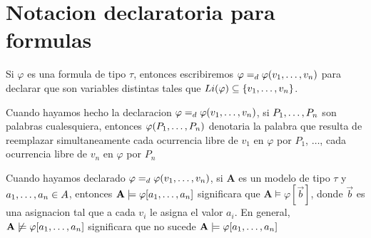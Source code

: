 \section{Notacion declaratoria para formulas}
\begin{definition}
  Si $\varphi$ es una formula de tipo $\tau$, entonces escribiremos $\varphi =_d \varphi(v_{1}, \dots, v_{n})$ para 
  declarar que  son variables distintas tales que $Li(\varphi) \subseteq \{v_{1}, \dots, v_{n}\}$.
\end{definition}

\begin{convention}
  Cuando hayamos hecho la declaracion $\varphi =_d \varphi(v_{1}, \dots, v_{n})$, si $P_{1}, \dots, P_{n}$ son palabras 
  cualesquiera, entonces $\varphi(P_{1}, \dots, P_{n})$ denotaria la palabra que resulta de 
  reemplazar simultaneamente cada ocurrencia libre de $v_1$ en $\varphi$ por $P_1$, $\dots$, cada ocurrencia libre de $v_n$
  en $\varphi$ por $P_n$ 
\end{convention}

\begin{convention}
  Cuando hayamos declarado $\varphi =_d \varphi(v_{1}, \dots, v_{n})$, si $\mathbf{A}$ es un modelo 
  de tipo $\tau$ y $a_{1}, \dots, a_{n} \in A$, entonces $\mathbf{A} \models \varphi[a_{1}, \dots, a_{n}]$
  significara que $\mathbf{A}\models\varphi[\vec{b}]$, donde $\vec{b}$ es una asignacion tal que a 
  cada $v_i$ le asigna el valor $a_i$. En general, $\mathbf{A}\not\models\varphi[a_{1}, \dots, a_{n}]$ significara que
  no sucede $\mathbf{A}\models\varphi[a_{1}, \dots, a_{n}]$
\end{convention}

